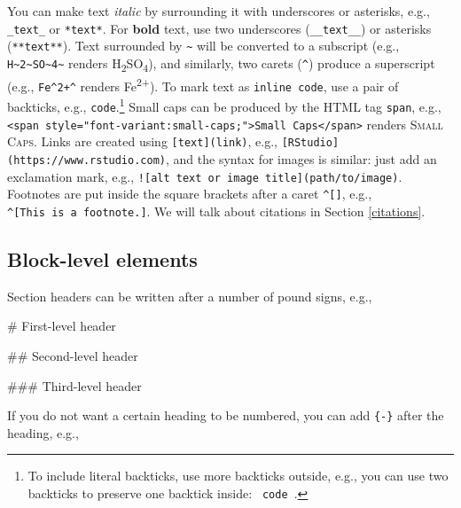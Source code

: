 \documentclass[
  12pt,
]{krantz}
\newenvironment{Shaded}{\begin{snugshade}}{\end{snugshade}}
\newcommand{\FunctionTok}[1]{\textcolor[rgb]{0.00,0.00,0.00}{#1}}
\theoremstyle{definition}
\theoremstyle{definition}
\theoremstyle{definition}
\theoremstyle{definition}
\theoremstyle{remark}
\begin{document}
You can make text \emph{italic} by surrounding it with underscores or asterisks, e.g., \texttt{\_text\_} or \texttt{*text*}. For \textbf{bold} text, use two underscores (\texttt{\_\_text\_\_}) or asterisks (\texttt{**text**}). Text surrounded by \texttt{\textasciitilde{}} will be converted to a subscript (e.g., \texttt{H\textasciitilde{}2\textasciitilde{}SO\textasciitilde{}4\textasciitilde{}} renders H\textsubscript{2}SO\textsubscript{4}), and similarly, two carets (\texttt{\^{}}) produce a superscript (e.g., \texttt{Fe\^{}2+\^{}} renders Fe\textsuperscript{2+}). To mark text as \texttt{inline\ code}, use a pair of backticks, e.g., \texttt{\textasciigrave{}code\textasciigrave{}}.\footnote{To include literal backticks, use more backticks outside, e.g., you can use two backticks to preserve one backtick inside: \texttt{\textasciigrave{}\textasciigrave{}\ \textasciigrave{}code\textasciigrave{}\ \textasciigrave{}\textasciigrave{}}.} Small caps can be produced by the HTML tag \texttt{span}, e.g., \texttt{\textless{}span\ style="font-variant:small-caps;"\textgreater{}Small\ Caps\textless{}/span\textgreater{}} renders \textsc{Small Caps}. Links are created using \texttt{{[}text{]}(link)}, e.g., \texttt{{[}RStudio{]}(https://www.rstudio.com)}, and the syntax for images is similar: just add an exclamation mark, e.g., \texttt{!{[}alt\ text\ or\ image\ title{]}(path/to/image)}. Footnotes are put inside the square brackets after a caret \texttt{\^{}{[}{]}}, e.g., \texttt{\^{}{[}This\ is\ a\ footnote.{]}}. We will talk about citations in Section \ref{citations}.

\hypertarget{block-level-elements}{%
\subsection{Block-level elements}\label{block-level-elements}}

Section headers can be written after a number of pound signs, e.g.,

\begin{Shaded}
\begin{Highlighting}[]
\FunctionTok{\# First{-}level header}

\FunctionTok{\#\# Second{-}level header}

\FunctionTok{\#\#\# Third{-}level header}
\end{Highlighting}
\end{Shaded}

If you do not want a certain heading to be numbered, you can add \texttt{\{-\}} after the heading, e.g.,
\end{document}
